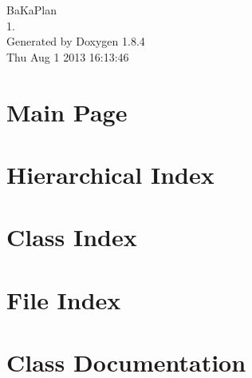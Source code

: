 \documentclass[twoside]{book}
\newcommand{\clearemptydoublepage}{%
  \newpage{\pagestyle{empty}\cleardoublepage}%
}
\begin{document}
\hypersetup{pageanchor=false}
\begin{titlepage}
\vspace*{7cm}
\begin{center}%
{\Large Ba\-Ka\-Plan \\[1ex]\large 1. }\\
\vspace*{1cm}
{\large Generated by Doxygen 1.8.4}\\
\vspace*{0.5cm}
{\small Thu Aug 1 2013 16:13:46}\\
\end{center}
\end{titlepage}
\clearemptydoublepage
\tableofcontents
\clearemptydoublepage
{}
\hypersetup{pageanchor=true}

\chapter{Main Page}
\label{index}\hypertarget{index}{}
\chapter{Hierarchical Index}

\chapter{Class Index}

\chapter{File Index}

\chapter{Class Documentation}

























\end{document}
